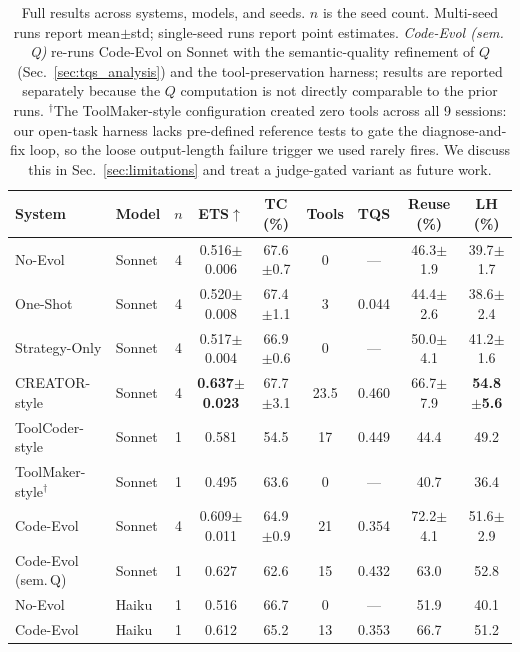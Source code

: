 \documentclass[sigplan,nonacm,natbib=false]{acmart}
\begin{document}
\begin{table}[t]
\centering\small
\begin{tabular}{llccccccc}
\toprule
\textbf{System} & \textbf{Model} & $n$ & \textbf{ETS}$\uparrow$ & \textbf{TC (\%)} & \textbf{Tools} & \textbf{TQS} & \textbf{Reuse (\%)} & \textbf{LH (\%)} \\
\midrule
No-Evol & Sonnet & 4 & 0.516$\pm$0.006 & 67.6$\pm$0.7 & 0 & --- & 46.3$\pm$1.9 & 39.7$\pm$1.7 \\
One-Shot & Sonnet & 4 & 0.520$\pm$0.008 & 67.4$\pm$1.1 & 3 & 0.044 & 44.4$\pm$2.6 & 38.6$\pm$2.4 \\
Strategy-Only & Sonnet & 4 & 0.517$\pm$0.004 & 66.9$\pm$0.6 & 0 & --- & 50.0$\pm$4.1 & 41.2$\pm$1.6 \\
CREATOR-style & Sonnet & 4 & \textbf{0.637$\pm$0.023} & 67.7$\pm$3.1 & 23.5 & 0.460 & 66.7$\pm$7.9 & \textbf{54.8$\pm$5.6} \\
ToolCoder-style & Sonnet & 1 & 0.581 & 54.5 & 17 & 0.449 & 44.4 & 49.2 \\
ToolMaker-style$^\dagger$ & Sonnet & 1 & 0.495 & 63.6 & 0 & --- & 40.7 & 36.4 \\
Code-Evol & Sonnet & 4 & 0.609$\pm$0.011 & 64.9$\pm$0.9 & 21 & 0.354 & 72.2$\pm$4.1 & 51.6$\pm$2.9 \\
Code-Evol (sem.\,Q) & Sonnet & 1 & 0.627 & 62.6 & 15 & 0.432 & 63.0 & 52.8 \\
\midrule
No-Evol & Haiku & 1 & 0.516 & 66.7 & 0 & --- & 51.9 & 40.1 \\
Code-Evol & Haiku & 1 & 0.612 & 65.2 & 13 & 0.353 & 66.7 & 51.2 \\
\bottomrule
\end{tabular}
\caption{Full results across systems, models, and seeds. $n$ is the seed count. Multi-seed runs report mean$\pm$std; single-seed runs report point estimates. \emph{Code-Evol (sem.\,Q)} re-runs Code-Evol on Sonnet with the semantic-quality refinement of $Q$ (Sec.~\ref{sec:tqs_analysis}) and the tool-preservation harness; results are reported separately because the $Q$ computation is not directly comparable to the prior runs. $^\dagger$The ToolMaker-style configuration created zero tools across all 9 sessions: our open-task harness lacks pre-defined reference tests to gate the diagnose-and-fix loop, so the loose output-length failure trigger we used rarely fires. We discuss this in Sec.~\ref{sec:limitations} and treat a judge-gated variant as future work.}
\label{tab:results}
\end{table}
\end{document}

